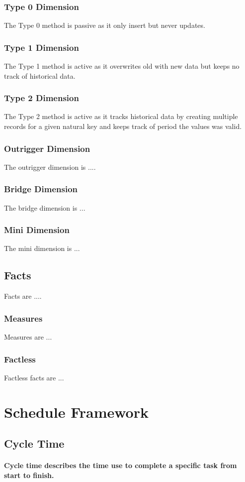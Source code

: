 \documentclass{acm_proc_article-sp}
\begin{document}
\subsubsection{Type 0 Dimension}
The Type 0 method is passive as it only insert but never updates.
\subsubsection{Type 1 Dimension}
The Type 1 method is active as it overwrites old with new data but keeps no track of historical data.
\subsubsection{Type 2 Dimension}
The Type 2 method is active as it tracks historical data by creating multiple records for a given natural key and keeps track of period the values was valid.
\subsubsection{Outrigger Dimension}
The outrigger dimension is ....
\subsubsection{Bridge Dimension}
The bridge dimension is ...
\subsubsection{Mini Dimension}
The mini dimension is ...
\subsection{Facts}
Facts are ....
\subsubsection{Measures}
Measures are ...
\subsubsection{Factless}
Factless facts are ...
\newpage
\section{Schedule Framework}
\subsection{Cycle Time}
\paragraph{Cycle time describes the time use to complete a specific task from start to finish.}
\end{document}
